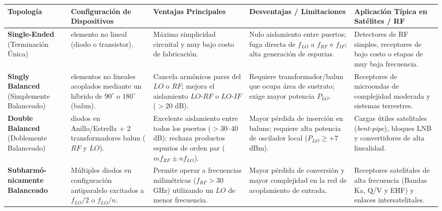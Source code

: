 \documentclass[11pt,a4paper,twoside]{report}
\begin{document}
	\begin{table}
		\centering
		\footnotesize %
		\setlength{\tabcolsep}{3.5pt} %
		\renewcommand{\arraystretch}{1.25} %
		
		\begin{tabularx}{\textwidth}{|
				>{\hsize=0.85\hsize\RaggedRight\arraybackslash}X|
				>{\hsize=0.75\hsize\RaggedRight\arraybackslash}X|
				>{\hsize=1.10\hsize\RaggedRight\arraybackslash}X|
				>{\hsize=1.15\hsize\RaggedRight\arraybackslash}X|
				>{\hsize=1.15\hsize\RaggedRight\arraybackslash}X|}
			\hline
			\textbf{Topología} & \textbf{Configuración de Dispositivos} & \textbf{Ventajas Principales} & \textbf{Desventajas / Limitaciones} & \textbf{Aplicación Típica en Satélites / RF} \\
			\hline
			\textbf{Single-Ended} \newline (Terminación Única) & 1 elemento no lineal (diodo o transistor). & Máxima simplicidad circuital y muy bajo costo de fabricación. & Nulo aislamiento entre puertos; fuga directa de $f_{LO}$ a $f_{RF}$ e $f_{IF}$; alta generación de espurias. & Detectores de RF simples, receptores de bajo costo o etapas de muy baja frecuencia. \\
			\hline
			\textbf{Singly Balanced} \newline (Simplemente Balanceado) & 2 elementos no lineales acoplados mediante un híbrido de $90^\circ$ o $180^\circ$ (balun). & Cancela armónicos pares del $LO$ o $RF$; mejora el aislamiento $LO$-$RF$ o $LO$-$IF$ ($> 20$ dB). & Requiere transformador/balun que ocupa área de sustrato; exige mayor potencia $P_{LO}$. & Receptores de microondas de complejidad moderada y sistemas terrestres. \\
			\hline
			\textbf{Double Balanced} \newline (Doblemente Balanceado) & 4 diodos en Anillo/Estrella + 2 transformadores balun ($RF$ y $LO$). & Excelente aislamiento entre todos los puertos ($> 30$--$40$ dB); rechaza productos espurios de orden par ($m f_{RF} \pm n f_{LO}$). & Mayor pérdida de inserción en baluns; requiere alta potencia de oscilador local ($P_{LO} \ge +7$ dBm). & Cargas útiles satelitales (\textit{bent-pipe}), bloques LNB y convertidores de alta linealidad. \\
			\hline
			\textbf{Subharmó-} \newline \textbf{nicamente} \newline \textbf{Balanceado} & Múltiples diodos en configuración antiparalelo excitados a $f_{LO}/2$ o $f_{LO}/n$. & Permite operar a frecuencias milimétricas ($f_{RF} > 30$ GHz) utilizando un $LO$ de menor frecuencia. & Mayor pérdida de conversión y mayor complejidad en la red de acoplamiento de entrada. & Receptores satelitales de alta frecuencia (Bandas Ka, Q/V y EHF) y enlaces intersatelitales. \\

\end{tabularx}
\end{table}
\end{document}
